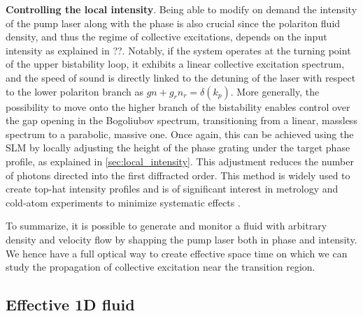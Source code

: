\textbf{Controlling the local intensity}. Being able to modify on demand the intensity of the pump laser along with the phase is also crucial since the polariton fluid density, and thus the regime of collective excitations, depends on the input intensity as explained in ??. 
Notably, if the system operates at the turning point of the upper bistability loop, it exhibits a linear collective excitation spectrum, and the speed of sound is directly linked to the detuning of the laser with respect to the lower polariton branch as $gn+g_rn_r=\delta(k_p)$. 
More generally, the possibility to move onto the higher branch of the bistability enables control over the gap opening in the Bogoliubov spectrum, transitioning from a linear, massless spectrum to a parabolic, massive one.  
Once again, this can be achieved using the SLM by locally adjusting the height of the phase grating under the target phase profile, as explained in \autoref{sec:local_intensity}. This adjustment reduces the number of photons directed into the first diffracted order. This method is widely used to create top-hat intensity profiles and is of significant interest in metrology and cold-atom experiments to minimize systematic effects \cite{top_metrology_2018}.  

\bigskip




To summarize, it is possible to generate and monitor a fluid with arbitrary density and velocity flow by shapping the pump laser both in phase and intensity. We hence have a full optical way to create
effective space time on which we can study the propagation of collective excitation near the transition region.

\subsection{Effective 1D fluid}

